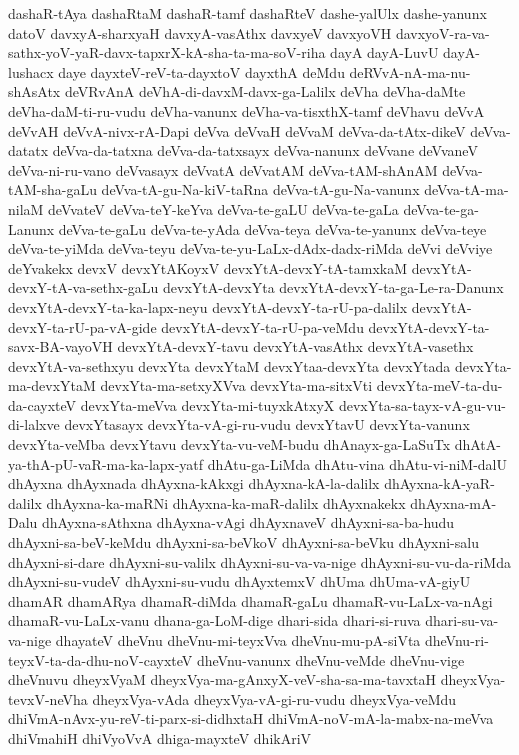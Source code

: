 {dashaR-tAya
dashaRtaM
dashaR-tamf
dashaRteV
dashe-yalUlx
dashe-yanunx
datoV
davxyA-sharxyaH
davxyA-vasAthx
davxyeV
davxyoVH
davxyoV-ra-va-sathx-yoV-yaR-davx-tapxrX-kA-sha-ta-ma-soV-riha
dayA
dayA-LuvU
dayA-lushacx
daye
dayxteV-reV-ta-dayxtoV
dayxthA
deMdu
deRVvA-nA-ma-nu-shAsAtx
deVRvAnA
deVhA-di-davxM-davx-ga-Lalilx
deVha
deVha-daMte
deVha-daM-ti-ru-vudu
deVha-vanunx
deVha-va-tisxthX-tamf
deVhavu
deVvA
deVvAH
deVvA-nivx-rA-Dapi
deVva
deVvaH
deVvaM
deVva-da-tAtx-dikeV
deVva-datatx
deVva-da-tatxna
deVva-da-tatxsayx
deVva-nanunx
deVvane
deVvaneV
deVva-ni-ru-vano
deVvasayx
deVvatA
deVvatAM
deVva-tAM-shAnAM
deVva-tAM-sha-gaLu
deVva-tA-gu-Na-kiV-taRna
deVva-tA-gu-Na-vanunx
deVva-tA-ma-nilaM
deVvateV
deVva-teY-keYva
deVva-te-gaLU
deVva-te-gaLa
deVva-te-ga-Lanunx
deVva-te-gaLu
deVva-te-yAda
deVva-teya
deVva-te-yanunx
deVva-teye
deVva-te-yiMda
deVva-teyu
deVva-te-yu-LaLx-dAdx-dadx-riMda
deVvi
deVviye
deYvakekx
devxV
devxYtAKoyxV
devxYtA-devxY-tA-tamxkaM
devxYtA-devxY-tA-va-sethx-gaLu
devxYtA-devxYta
devxYtA-devxY-ta-ga-Le-ra-Danunx
devxYtA-devxY-ta-ka-lapx-neyu
devxYtA-devxY-ta-rU-pa-dalilx
devxYtA-devxY-ta-rU-pa-vA-gide
devxYtA-devxY-ta-rU-pa-veMdu
devxYtA-devxY-ta-savx-BA-vayoVH
devxYtA-devxY-tavu
devxYtA-vasAthx
devxYtA-vasethx
devxYtA-va-sethxyu
devxYta
devxYtaM
devxYtaa-devxYta
devxYtada
devxYta-ma-devxYtaM
devxYta-ma-setxyXVva
devxYta-ma-sitxVti
devxYta-meV-ta-du-da-cayxteV
devxYta-meVva
devxYta-mi-tuyxkAtxyX
devxYta-sa-tayx-vA-gu-vu-di-lalxve
devxYtasayx
devxYta-vA-gi-ru-vudu
devxYtavU
devxYta-vanunx
devxYta-veMba
devxYtavu
devxYta-vu-veM-budu
dhAnayx-ga-LaSuTx
dhAtA-ya-thA-pU-vaR-ma-ka-lapx-yatf
dhAtu-ga-LiMda
dhAtu-vina
dhAtu-vi-niM-dalU
dhAyxna
dhAyxnada
dhAyxna-kAkxgi
dhAyxna-kA-la-dalilx
dhAyxna-kA-yaR-dalilx
dhAyxna-ka-maRNi
dhAyxna-ka-maR-dalilx
dhAyxnakekx
dhAyxna-mA-Dalu
dhAyxna-sAthxna
dhAyxna-vAgi
dhAyxnaveV
dhAyxni-sa-ba-hudu
dhAyxni-sa-beV-keMdu
dhAyxni-sa-beVkoV
dhAyxni-sa-beVku
dhAyxni-salu
dhAyxni-si-dare
dhAyxni-su-valilx
dhAyxni-su-va-va-nige
dhAyxni-su-vu-da-riMda
dhAyxni-su-vudeV
dhAyxni-su-vudu
dhAyxtemxV
dhUma
dhUma-vA-giyU
dhamAR
dhamARya
dhamaR-diMda
dhamaR-gaLu
dhamaR-vu-LaLx-va-nAgi
dhamaR-vu-LaLx-vanu
dhana-ga-LoM-dige
dhari-sida
dhari-si-ruva
dhari-su-va-va-nige
dhayateV
dheVnu
dheVnu-mi-teyxVva
dheVnu-mu-pA-siVta
dheVnu-ri-teyxV-ta-da-dhu-noV-cayxteV
dheVnu-vanunx
dheVnu-veMde
dheVnu-vige
dheVnuvu
dheyxVyaM
dheyxVya-ma-gAnxyX-veV-sha-sa-ma-tavxtaH
dheyxVya-tevxV-neVha
dheyxVya-vAda
dheyxVya-vA-gi-ru-vudu
dheyxVya-veMdu
dhiVmA-nAvx-yu-reV-ti-parx-si-didhxtaH
dhiVmA-noV-mA-la-mabx-na-meVva
dhiVmahiH
dhiVyoVvA
dhiga-mayxteV
dhikAriV
}

